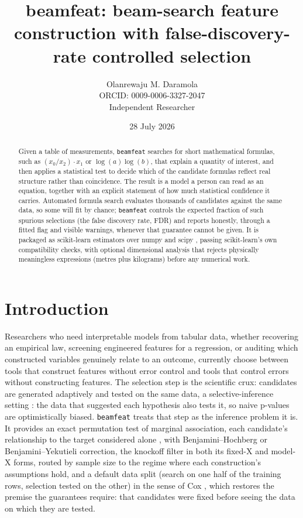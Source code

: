 \documentclass[
]{article}
\title{beamfeat: beam-search feature construction with
false-discovery-rate controlled selection}
\author{Olanrewaju M. Daramola\\[2pt]
{\small ORCID: 0009-0006-3327-2047}\\[1pt]
{\small Independent Researcher}}
\date{28 July 2026}
\begin{document}
\maketitle

\begin{abstract}
\noindent Given a table of measurements, \texttt{beamfeat} searches for short
mathematical formulas, such as \((x_0 / x_2) \cdot x_1\) or
\(\log(a)\log(b)\), that explain a quantity of interest, and then
applies a statistical test to decide which of the candidate formulas
reflect real structure rather than coincidence. The result is a model a
person can read as an equation, together with an explicit statement of
how much statistical confidence it carries. Automated formula search
evaluates thousands of candidates against the same data, so some will
fit by chance; \texttt{beamfeat} controls the expected fraction of such
spurious selections (the false discovery rate, FDR) and reports
honestly, through a fitted flag and visible warnings, whenever that
guarantee cannot be given. It is packaged as scikit-learn
\citep{scikit-learn} estimators over numpy \citep{harris2020} and scipy
\citep{virtanen2020}, passing scikit-learn's own compatibility checks,
with optional dimensional analysis that rejects physically meaningless
expressions (metres plus kilograms) before any numerical work.

\end{abstract}

\hypertarget{introduction}{%
\section{Introduction}\label{introduction}}

Researchers who need interpretable models from tabular data, whether
recovering an empirical law, screening engineered features for a
regression, or auditing which constructed variables genuinely relate to
an outcome, currently choose between tools that construct features
without error control and tools that control errors without constructing
features. The selection step is the scientific crux: candidates are
generated adaptively and tested on the same data, a selective-inference
setting \citep{taylor2015, wasserman2009}: the data that suggested each
hypothesis also tests it, so naive p-values are optimistically biased.
\texttt{beamfeat} treats that step as the inference problem it is. It
provides an exact permutation test of marginal association, each
candidate's relationship to the target considered alone
\citep{phipson2010}, with Benjamini--Hochberg \citep{bh1995} or
Benjamini--Yekutieli \citep{by2001} correction, the knockoff filter in
both its fixed-X \citep{barber2015} and model-X \citep{candes2018}
forms, routed by sample size to the regime where each construction's
assumptions hold, and a default data split (search on one half of the
training rows, selection tested on the other) in the sense of Cox
\citep{cox1975}, which restores the premise the guarantees require: that
candidates were fixed before seeing the data on which they are tested.
\end{document}
